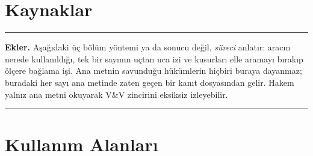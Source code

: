 \documentclass[11pt,a4paper]{article}
\begin{document}
\section*{Kaynaklar}



\appendix
\renewcommand{\thesection}{EK-\Alph{section}}
\setcounter{section}{0}

\noindent\rule{\linewidth}{0.4pt}
\vspace{2pt}

\noindent\textbf{Ekler.} Aşağıdaki üç bölüm yöntemi ya da sonucu değil,
\emph{süreci} anlatır: aracın nerede kullanıldığı, tek bir sayının uçtan uca
izi ve kusurları elle aramayı bırakıp ölçere bağlama işi. Ana metnin
savunduğu hükümlerin hiçbiri buraya dayanmaz; buradaki her sayı ana metinde
zaten geçen bir kanıt dosyasından gelir. Hakem yalnız ana metni okuyarak
V\&V zincirini eksiksiz izleyebilir.

\vspace{4pt}
\noindent\rule{\linewidth}{0.4pt}

\section{Kullanım Alanları}
\end{document}
